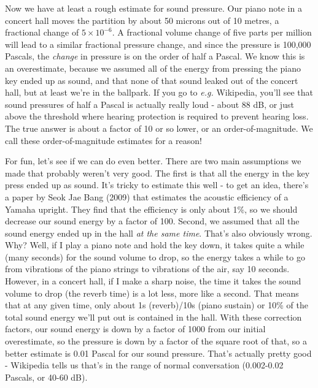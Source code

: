 \documentclass[letterpaper,11pt,preprint]{aastex}
\begin{document}
Now we have at least a rough estimate for sound pressure.  Our piano
note in a concert hall moves the partition by about 50 microns out of
10 metres, a fractional change of $5\times 10^{-6}$.  A fractional
volume change of five parts per million will lead to a similar
fractional pressure change, and since the pressure is 100,000 Pascals,
the \textit{change} in pressure is on the order of half a Pascal.  We
know this is an overestimate, because we assumed all of the energy
from pressing the piano key ended up as sound, and that none of that
sound leaked out of the concert hall, but at least we're in the
ballpark.  If you go to \textit{e.g.} Wikipedia, you'll see that sound
pressures of half a Pascal is actually really loud - about 88 dB, or
just above the threshold where hearing protection is required to
prevent hearing loss.  The true answer is about a factor of 10 or so
lower, or an order-of-magnitude.  We call these order-of-magnitude
estimates for a reason!

For fun, let's see if we can do even better.  There are two main
assumptions we made that probably weren't very good.  The first is
that all the energy in the key press ended up as sound.  It's tricky
to estimate this well - to get an idea, there's a paper by Seok Jae
Bang (2009) that estimates the acoustic efficiency of a Yamaha
upright.  They find that the efficiency is only about 1\%, so we
should decrease our sound energy by a factor of 100.  Second, we
assumed that all the sound energy ended up in the hall \textit{at the
  same time}.  That's also obviously wrong.  Why?  Well, if I play a
piano note and hold the key down, it takes quite a while (many
seconds) for the sound volume to drop, so the energy takes a while to
go from vibrations of the piano strings to vibrations of the air, say
10 seconds.  However, in a concert hall, if I make a sharp noise, the time
it takes the sound volume to drop (the reverb time) is a lot less,
more like a second.  That means that at any given time, only about 1s
(reverb)/10s (piano sustain) or 10\% of the total sound energy we'll
put out is contained in the hall.  With these correction factors, our
sound energy is down by a factor of 1000 from our initial
overestimate, so the pressure is down by a factor of the square root
of that, so a better estimate is 0.01 Pascal for our sound pressure.
That's actually pretty good - Wikipedia tells us that's in the range
of normal conversation (0.002-0.02 Pascals, or 40-60 dB).
\end{document}
